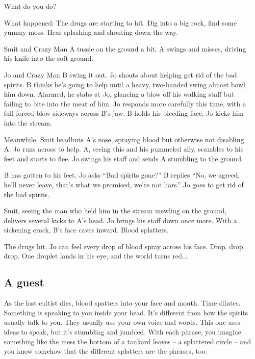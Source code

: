 \begin{multicols}{2}
What do you do?

\begin{aloud}
  What happened: The drugs are starting to hit.
  Dig into a big rock, find some yummy moss.
  Hear splashing and shouting down the way.

  Smit and Crazy Man A tussle on the ground a bit.
  A swings and misses, driving his knife into the soft ground.

  Jo and Crazy Man B swing it out.
  Jo shouts about helping get rid of the bad spirits.
  B thinks he's going to help until a heavy, two-handed swing almost bowl him down.
  Alarmed, he stabs at Jo, glancing a blow off his walking staff but failing to bite into the meat of him.
  Jo responds more carefully this time, with a full-forced blow sideways across B's jaw.
  B holds his bleeding face, Jo kicks him into the stream.

  Meanwhile, Smit headbuts A's nose, spraying blood but otherwise not disabling A.
  Jo runs across to help.
  A, seeing this and his pummeled ally, scambles to his feet and starts to flee.
  Jo swings his staff and sends A stumbling to the ground.

  B has gotten to his feet.
  Jo asks ``Bad spirits gone?''
  B replies ``No, we agreed, he'll never leave, that's what we promised, we're not liars.''
  Jo goes to get rid of the bad spirits.

  Smit, seeing the man who held him in the stream mewling on the ground, delivers several kicks
    to A's head.
  Jo brings his staff down once more.
  With a sickening crack, B's face caves inward.
  Blood splatters.

  The drugs hit.
  Jo can feel every drop of blood spray across his face.
  Drop.  drop.  drop.
  One droplet lands in his eye, and the world turns red...
\end{aloud}

  \subsection{A guest}
As the last cultist dies, blood spatters into your face and mouth.
Time dilates.
Something is speaking to you inside your head.
It's different from how the spirits usually talk to you.
They usually use your own voice and words.
This one uses ideas to speak, but it's stumbling and jumbled.
With each phrase, you imagine something like the mess the bottom of a tankard leaves --
  a splattered circle -- and you know somehow that the different splatters are the phrases, too.



\end{multicols}

